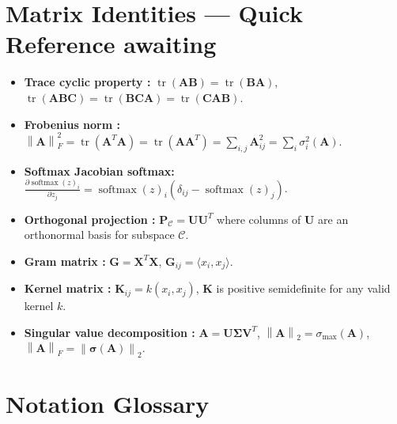 \documentclass[12pt,a4paper]{article}
\theoremstyle{definition}
\DeclareMathOperator{\tr}{tr}
\DeclareMathOperator{\softmax}{softmax}
\newcommand{\cC}{\mathcal{C}}
\newcommand{\norm}[1]{\left\lVert#1\right\rVert}
\newcommand{\inner}[2]{\langle #1, #2 \rangle}
\newcommand{\mat}[1]{\mathbf{#1}}
\newcommand{\smax}{\sigma_{\max}}
\begin{document}
\section{Matrix Identities — Quick Reference awaiting}
\label{app:matrix_identities}

\begin{itemize}[nosep]
    \item \textbf{Trace cyclic property :} $\tr(\mat{A}\mat{B}) = \tr(\mat{B}\mat{A})$, 
    $\tr(\mat{A}\mat{B}\mat{C}) = \tr(\mat{B}\mat{C}\mat{A}) = \tr(\mat{C}\mat{A}\mat{B})$.
    
    \item \textbf{Frobenius norm :} 
    $\norm{\mat{A}}_F^2 = \tr(\mat{A}^T \mat{A}) = \tr(\mat{A}\mat{A}^T) = \sum_{i,j} \mat{A}_{ij}^2 = \sum_i \sigma_i^2(\mat{A})$.
    
    \item \textbf{Softmax Jacobian softmax:} 
    $\frac{\partial \softmax(z)_i}{\partial z_j} = \softmax(z)_i(\delta_{ij} - \softmax(z)_j)$.
    
    \item \textbf{Orthogonal projection :} 
    $\mat{P}_{\cC} = \mat{U}\mat{U}^T$ where columns of $\mat{U}$ are an orthonormal basis for subspace $\cC$.
    
    \item \textbf{Gram matrix :} 
    $\mat{G} = \mat{X}^T \mat{X}$, $\mat{G}_{ij} = \inner{x_i}{x_j}$.
    
    \item \textbf{Kernel matrix :} 
    $\mat{K}_{ij} = k(x_i, x_j)$, $\mat{K}$ is positive semidefinite for any valid kernel $k$.
    
    \item \textbf{Singular value decomposition :} 
    $\mat{A} = \mat{U} \boldsymbol{\Sigma} \mat{V}^T$, 
    $\norm{\mat{A}}_2 = \smax(\mat{A})$, $\norm{\mat{A}}_F = \norm{\boldsymbol{\sigma}(\mat{A})}_2$.
\end{itemize}

\section{Notation Glossary }
\label{app:notation}
\end{document}
